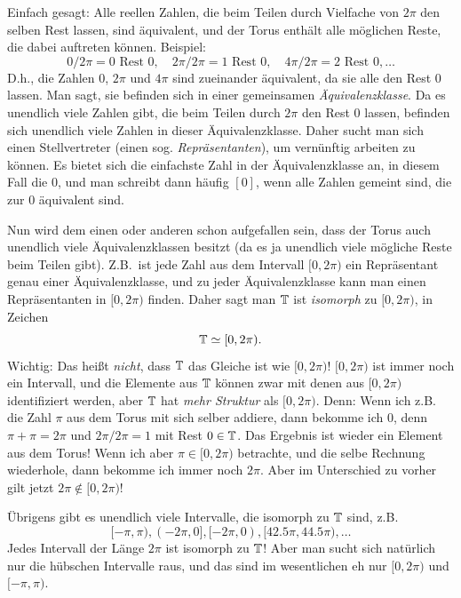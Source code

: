 \begin{remark}[Torus]
Einfach gesagt: Alle reellen Zahlen, die beim Teilen durch Vielfache von $ 2\pi $ den selben Rest 
lassen, sind äquivalent, und der Torus enthält alle möglichen Reste, die dabei auftreten können. 
Beispiel:
\[
0 / 2\pi = 0 \text{ Rest } 0, \quad 
2\pi / 2\pi = 1 \text{ Rest } 0, \quad 
4\pi / 2\pi = 2 \text{ Rest } 0, \dots
\]
D.h., die Zahlen $ 0 $, $ 2\pi $ und $ 4\pi $ sind zueinander äquivalent, da sie alle den Rest $ 0 $
lassen. Man sagt, sie befinden sich in einer gemeinsamen \emph{Äquivalenzklasse}. Da es unendlich
viele Zahlen gibt, die beim Teilen durch $ 2\pi $ den Rest $ 0 $ lassen, befinden sich unendlich
viele Zahlen in dieser Äquivalenzklasse. Daher sucht man sich einen Stellvertreter (einen sog.
\emph{Repräsentanten}), um vernünftig arbeiten zu können. Es bietet sich die einfachste Zahl in der
Äquivalenzklasse an, in diesem Fall die $ 0 $, und man schreibt dann häufig $ [0] $, wenn alle 
Zahlen gemeint sind, die zur $ 0 $ äquivalent sind.

Nun wird dem einen oder anderen schon aufgefallen sein, dass der Torus auch unendlich viele 
Äquivalenzklassen besitzt (da es ja unendlich viele mögliche Reste beim Teilen gibt).
Z.B.\ ist jede Zahl aus dem Intervall $ [0, 2\pi) $ ein Repräsentant genau einer Äquivalenzklasse,
und zu jeder Äquivalenzklasse kann man einen Repräsentanten in $ [0, 2\pi) $ finden. Daher sagt man
$ \mathbb{T} $ ist \emph{isomorph} zu $ [0, 2\pi) $, in Zeichen
\[
  \mathbb{T} \simeq [0, 2\pi).
\]
Wichtig: Das heißt \emph{nicht}, dass $ \mathbb{T} $ das Gleiche ist wie $ [0, 2\pi) $! $ [0, 2\pi) $
ist immer noch ein Intervall, und die Elemente aus $ \mathbb{T} $ können zwar mit denen aus $ [0, 2\pi) $ 
identifiziert werden, aber $ \mathbb{T} $ hat \emph{mehr Struktur} als $ [0, 2\pi) $. Denn: Wenn ich z.B. 
die Zahl $ \pi $ aus dem Torus mit sich selber addiere, dann bekomme ich $ 0 $, denn
$ \pi + \pi = 2\pi $ und $ 2\pi / 2\pi = 1 $ mit Rest $ 0 \in \mathbb{T} $. Das Ergebnis ist wieder ein 
Element aus dem Torus! Wenn ich aber $ \pi \in [0, 2\pi) $ betrachte, und die selbe Rechnung
wiederhole, dann bekomme ich immer noch $ 2\pi $. Aber im Unterschied zu vorher gilt jetzt
$ 2\pi \notin [0, 2\pi) $!

Übrigens gibt es unendlich viele Intervalle, die isomorph zu $ \mathbb{T} $ sind, z.B.
\[
  [-\pi, \pi), (-2\pi, 0], [-2\pi, 0), [42.5\pi, 44.5\pi), \dots
\]
Jedes Intervall der Länge $ 2\pi $ ist isomorph zu $ \mathbb{T} $! Aber man sucht sich natürlich nur die
hübschen Intervalle raus, und das sind im wesentlichen eh nur $ [0, 2\pi) $ und $ [-\pi, \pi) $.
\end{remark}

